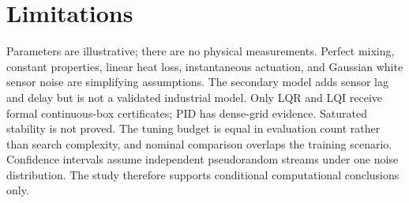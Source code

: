 \section{Limitations}
Parameters are illustrative; there are no physical measurements. Perfect mixing, constant properties, linear heat loss, instantaneous actuation, and Gaussian white sensor noise are simplifying assumptions. The secondary model adds sensor lag and delay but is not a validated industrial model. Only LQR and LQI receive formal continuous-box certificates; PID has dense-grid evidence. Saturated stability is not proved. The tuning budget is equal in evaluation count rather than search complexity, and nominal comparison overlaps the training scenario. Confidence intervals assume independent pseudorandom streams under one noise distribution. The study therefore supports conditional computational conclusions only.

